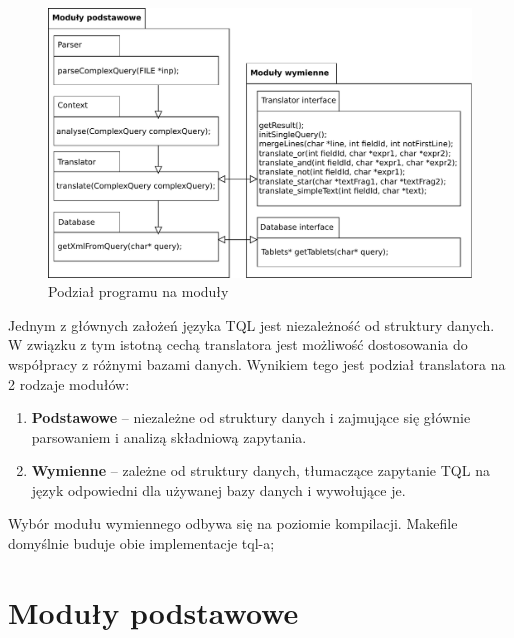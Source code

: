 \begin{figure}
 \centering
 \includegraphics[width=500px]{../diagramy/pakiety.pdf}
 \caption{Podział programu na moduły}
\end{figure}
Jednym z głównych założeń języka TQL jest niezależność od struktury danych.
W związku z tym istotną cechą translatora jest możliwość dostosowania do współpracy z różnymi bazami danych.
 Wynikiem tego jest podział translatora na 2 rodzaje modułów:
\begin{enumerate}
 \item \textbf{Podstawowe} -- niezależne od struktury danych i zajmujące się głównie parsowaniem i analizą składniową zapytania.
 \item \textbf{Wymienne} -- zależne od struktury danych, tłumaczące zapytanie TQL na język odpowiedni dla używanej bazy danych
i wywołujące je.
\end{enumerate}
 Wybór modułu wymiennego odbywa się na poziomie kompilacji. Makefile domyślnie buduje obie implementacje tql-a;


\section{Moduły podstawowe}

